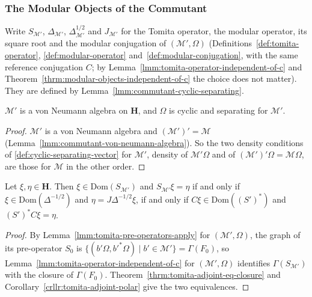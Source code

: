 \subsubsection{The Modular Objects of the Commutant}

Write $S_{\mathcal{M}'}$, $\Delta_{\mathcal{M}'}$, $\Delta_{\mathcal{M}'}^{1/2}$ and $J_{\mathcal{M}'}$ for the Tomita operator, the modular operator, its square root and the modular conjugation of $(\mathcal{M}', \Omega)$ (Definitions~\ref{def:tomita-operator}, \ref{def:modular-operator} and~\ref{def:modular-conjugation}, with the same reference conjugation $C$; by Lemma~\ref{lmm:tomita-operator-independent-of-c} and Theorem~\ref{thrm:modular-objects-independent-of-c} the choice does not matter). They are defined by Lemma~\ref{lmm:commutant-cyclic-separating}.

\begin{lemma}
    \label{lmm:commutant-cyclic-separating}
    \leanok
    $\mathcal{M}'$ is a von Neumann algebra on $\mathbf{H}$, and $\Omega$ is cyclic and separating for $\mathcal{M}'$.
\end{lemma}
\begin{proof}
    \leanok
    $\mathcal{M}'$ is a von Neumann algebra and $(\mathcal{M}')' = \mathcal{M}$ (Lemma~\ref{lmm:commutant-von-neumann-algebra}). So the two density conditions of \ref{def:cyclic-separating-vector} for $\mathcal{M}'$, density of $\mathcal{M}'\Omega$ and of $(\mathcal{M}')'\Omega = \mathcal{M}\Omega$, are those for $\mathcal{M}$ in the other order.
\end{proof}

\begin{lemma}
    \label{lmm:commutant-tomita-operator}
    \leanok
    Let $\xi, \eta \in \mathbf{H}$. Then $\xi \in \text{Dom}(S_{\mathcal{M}'})$ and $S_{\mathcal{M}'}\xi = \eta$ if and only if $\xi \in \text{Dom}(\Delta^{-1/2})$ and $\eta = J\Delta^{-1/2}\xi$, if and only if $C\xi \in \text{Dom}((S')^*)$ and $(S')^*C\xi = \eta$.
\end{lemma}
\begin{proof}
    \leanok
    By Lemma~\ref{lmm:tomita-pre-operators-apply} for $(\mathcal{M}', \Omega)$, the graph of its pre-operator $S_0$ is $\{ (b'\Omega, b'^*\Omega) \mid b' \in \mathcal{M}' \} = \Gamma(F_0)$, so Lemma~\ref{lmm:tomita-operator-independent-of-c} for $(\mathcal{M}', \Omega)$ identifies $\Gamma(S_{\mathcal{M}'})$ with the closure of $\Gamma(F_0)$. Theorem~\ref{thrm:tomita-adjoint-eq-closure} and Corollary~\ref{crllr:tomita-adjoint-polar} give the two equivalences.
\end{proof}

